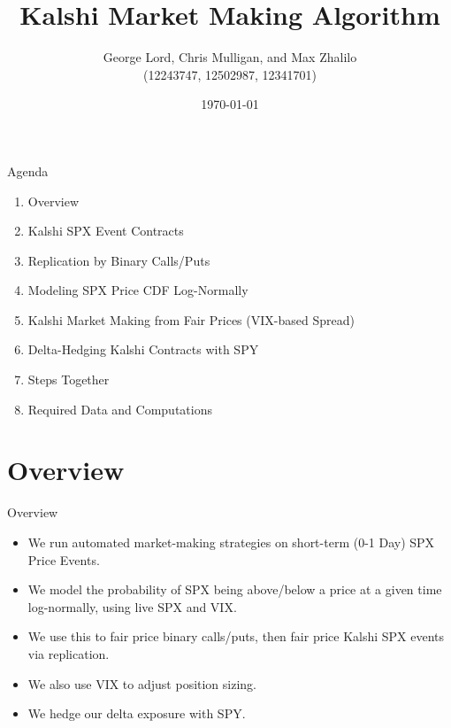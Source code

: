 \documentclass[aspectratio=169]{beamer}
\title{Kalshi Market Making Algorithm}
\author{George Lord, Chris Mulligan, and Max Zhalilo \\ (12243747, 12502987, 12341701)}
\date{\today}
\begin{document}
\begin{frame}[plain]
  \titlepage
\end{frame}

\begin{frame}{Agenda}
  \begin{enumerate}
    \item Overview
    \item Kalshi SPX Event Contracts
    \item Replication by Binary Calls/Puts
    \item Modeling SPX Price CDF Log-Normally
    \item Kalshi Market Making from Fair Prices (VIX-based Spread)
    \item Delta-Hedging Kalshi Contracts with SPY
    \item Steps Together
    \item Required Data and Computations
  \end{enumerate}
\end{frame}

\section{Overview}

\begin{frame}{Overview}
  \begin{itemize}
    \item We run automated market-making strategies on short-term (0-1 Day) SPX Price Events.
    \item We model the probability of SPX being above/below a price at a given time log-normally, using live SPX and VIX.
    \item We use this to fair price binary calls/puts, then fair price Kalshi SPX events via replication.
    \item We also use VIX to adjust position sizing.
    \item We hedge our delta exposure with SPY.
  \end{itemize}
\end{frame}
\end{document}
